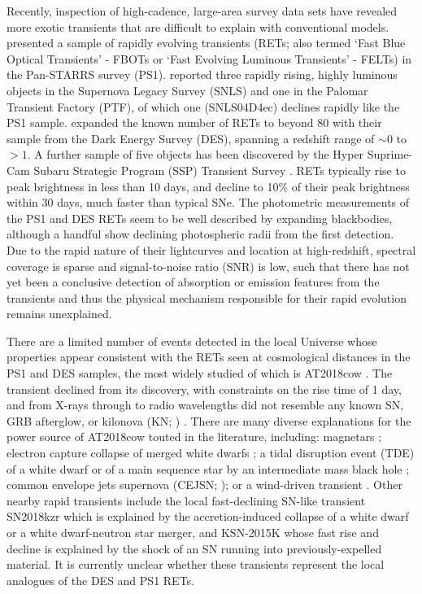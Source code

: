 \documentclass[fleqn,usenatbib,]{mnras}
\begin{document}
Recently, inspection of high-cadence, large-area survey data sets have revealed more exotic transients that are difficult to explain with conventional models. \citet{Drout2014} presented a sample of rapidly evolving transients (RETs; also termed `Fast Blue Optical Transients' - FBOTs or `Fast Evolving Luminous Transients' - FELTs) in the Pan-STARRS survey (PS1). \citet{Arcavi2016} reported three rapidly rising, highly luminous objects in the Supernova Legacy Survey (SNLS) and one in the Palomar Transient Factory (PTF), of which one (SNLS04D4ec) declines rapidly like the PS1 sample. \citet[hereafter P18]{Pursiainen2018} expanded the known number of RETs to beyond 80 with their sample from the Dark Energy Survey (DES), spanning a redshift range of $\sim 0$ to $>1$. A further sample of five objects has been discovered by the Hyper Suprime-Cam Subaru Strategic Program (SSP) Transient Survey \citep{Tampo2020}. RETs typically rise to peak brightness in less than 10 days, and decline to 10\% of their peak brightness within 30 days, much faster than typical SNe. The photometric measurements of the PS1 and DES RETs seem to be well described by expanding blackbodies, although a handful show declining photospheric radii from the first detection. Due to the rapid nature of their lightcurves and location at high-redshift, spectral coverage is sparse and signal-to-noise ratio (SNR) is low, such that there has not yet been a conclusive detection of absorption or emission features from the transients and thus the physical mechanism responsible for their rapid evolution remains unexplained.

There are a limited number of events detected in the local Universe whose properties appear consistent with the RETs seen at cosmological distances in the PS1 and DES samples, the most widely studied of which is AT2018cow \citep[e.g.][]{Prentice2018,Margutti2019,Perley2019}. The transient declined from its discovery, with constraints on the rise time of 1 day, and from X-rays through to radio wavelengths did not resemble any known SN, GRB afterglow, or kilonova (KN; \citealt{Ho2019}) . There are many diverse explanations for the power source of AT2018cow touted in the literature, including: magnetars \citep{Mohan2020}; electron capture collapse of merged white dwarfs \citep{Lyutikov2019}; a tidal disruption event (TDE) of a white dwarf \citep{Kuin2019} or of a main sequence star by an intermediate mass black hole \citep{Perley2019}; common envelope jets supernova (CEJSN; \citealt{Soker2019}); or a wind-driven transient \citep{Uno2020}.
Other nearby rapid transients include the local fast-declining SN-like transient SN2018kzr \citep{McBrien2019} which is explained by the accretion-induced collapse of a white dwarf or a white dwarf-neutron star merger, and KSN-2015K \citep{Rest2018} whose fast rise and decline is explained by the shock of an SN running into previously-expelled material.  It is currently unclear whether these transients represent the local analogues of the DES and PS1 RETs.
\end{document}
